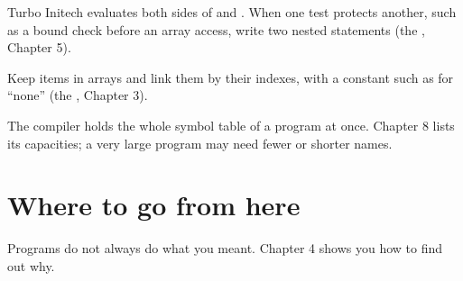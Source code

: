 Turbo Initech evaluates both sides of  and
.  When one test protects another, such as a bound check before an
array access, write two nested  statements (the
, Chapter 5).

Keep items in arrays and link them by
their indexes, with a constant such as  for ``none'' (the
, Chapter 3).

The compiler holds the whole symbol table of a program
at once.  Chapter 8 lists its capacities; a very large program may need
fewer or shorter names.

\section{Where to go from here}
Programs do not always do what you meant.  Chapter 4 shows you how to find
out why.
